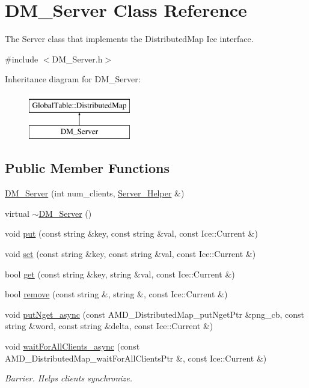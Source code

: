 \hypertarget{class_d_m___server}{
\section{DM\_\-Server Class Reference}
\label{class_d_m___server}
}


The Server class that implements the DistributedMap Ice interface.  




{\ttfamily \#include $<$DM\_\-Server.h$>$}

Inheritance diagram for DM\_\-Server:\begin{figure}[H]
\begin{center}
\leavevmode
\includegraphics[height=2cm]{class_d_m___server}
\end{center}
\end{figure}
\subsection*{Public Member Functions}
\begin{DoxyCompactItemize}
\item 
\hyperlink{class_d_m___server_a1cd634944614b427c01095814f91e8e4}{DM\_\-Server} (int num\_\-clients, \hyperlink{class_server___helper}{Server\_\-Helper} \&)
\item 
virtual \hyperlink{class_d_m___server_a5ca03ed605fe2eeabfc0e86b8d9348e5}{$\sim$DM\_\-Server} ()
\item 
void \hyperlink{class_d_m___server_a2ef825954e6bfea85484800642f93136}{put} (const string \&key, const string \&val, const Ice::Current \&)
\item 
void \hyperlink{class_d_m___server_af56ffe1e8d40e23d30f4bf1a93b1a6c8}{set} (const string \&key, const string \&val, const Ice::Current \&)
\item 
bool \hyperlink{class_d_m___server_ae440379cb66a3725c1fd7666e6287fa1}{get} (const string \&key, string \&val, const Ice::Current \&)
\item 
bool \hyperlink{class_d_m___server_af60a2b4c3d5f5bfaceaa09797ecf54f8}{remove} (const string \&, string \&, const Ice::Current \&)
\item 
void \hyperlink{class_d_m___server_ad90ade02956d09234831cf7edd61fff5}{putNget\_\-async} (const AMD\_\-DistributedMap\_\-putNgetPtr \&png\_\-cb, const string \&word, const string \&delta, const Ice::Current \&)
\item 
void \hyperlink{class_d_m___server_adedd58e27509b0a4eeebbc08cb5c20d8}{waitForAllClients\_\-async} (const AMD\_\-DistributedMap\_\-waitForAllClientsPtr \&, const Ice::Current \&)
\begin{DoxyCompactList}\small\item\em Barrier. Helps clients synchronize. \item\end{DoxyCompactList}\end{DoxyCompactItemize}


